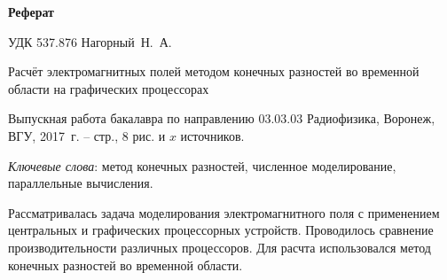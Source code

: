 \begin{center}
\textbf{Реферат}
\end{center}

УДК 537.876 \hfill Нагорный~Н.~А.

\vspace{10mm}

Расчёт электромагнитных полей методом конечных разностей во
временной области на графических процессорах


Выпускная работа бакалавра по направлению 03.03.03 Радиофизика, Воронеж, ВГУ, 2017~г. -- \pageref{LastPage} стр., 8 рис. и $ x $ источников.

\textit{Ключевые слова}: метод конечных разностей, численное моделирование, параллельные вычисления.

Рассматривалась задача моделирования электромагнитного поля с применением центральных и графических процессорных устройств. Проводилось сравнение производительности различных процессоров. Для расчта использовался метод конечных разностей во временной области.

\clearpage